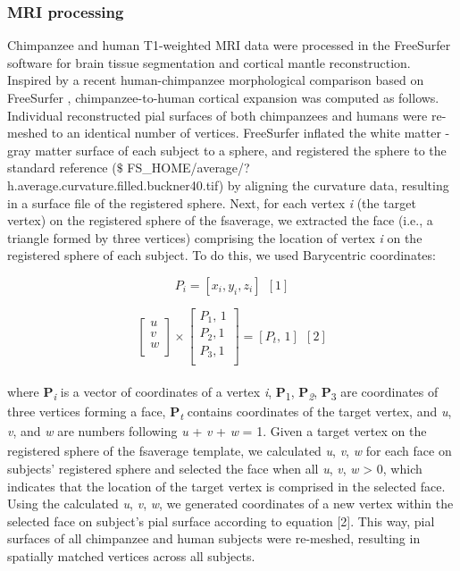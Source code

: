 \begin{refsection}
\subsubsection*{MRI processing}
Chimpanzee and human T1-weighted MRI data were processed in the FreeSurfer software \citep{Fischl2004parcellation,FISCHL2012Freesurfer} for brain tissue segmentation and cortical mantle reconstruction. Inspired by a recent human-chimpanzee morphological comparison based on FreeSurfer \citep{donahue2018quantitative}, chimpanzee-to-human cortical expansion was computed as follows. Individual reconstructed pial surfaces of both chimpanzees and humans were re-meshed to an identical number of vertices. FreeSurfer inflated the white matter - gray matter surface of each subject to a sphere, and registered the sphere to the standard reference ($\$$ FS\_HOME/average/?h.average.curvature.filled.buckner40.tif) by aligning the curvature data, resulting in a surface file of the registered sphere. Next, for each vertex \textit{i} (the target vertex) on the registered sphere of the fsaverage, we extracted the face (i.e., a triangle formed by three vertices) comprising the location of vertex \textit{i} on the registered sphere of each subject. To do this, we used Barycentric coordinates:

\[ P_{i}= [x_{i}, y_{i}, z_{i}] \ \ [1] \]

\[  \left[ \begin{matrix}
u\\
v\\
w\\
\end{matrix}
 \right]  \times  \left[ \begin{matrix}
P_{1}\text{, 1}\\
P_{2},1\\
P_{3},1\\
\end{matrix}
 \right] = \left[ P_{t}\text{, 1} \right] \ \ [2] \] \\

where \textbf{P}\textit{\textsubscript{i}} is a vector of coordinates of a vertex \textit{i}, \textbf{P}\textsubscript{1}, \textbf{P}\textit{\textsubscript{2}}, \textbf{P}\textsubscript{3} are coordinates of three vertices forming a face, \textbf{P}\textit{\textsubscript{t}}\textsubscript{ }contains coordinates of the target vertex, and \textit{u}, \textit{v}, and \textit{w} are numbers following \textit{u} + \textit{v} + \textit{w} = 1. Given a target vertex\textit{\textsubscript{ }}on the registered sphere of the fsaverage template, we calculated \textit{u}, \textit{v}, \textit{w }for each face on subjects’ registered sphere and selected the face when all \textit{u}, \textit{v}, \textit{w} > 0, which indicates that the location of the target vertex is comprised in the selected face. Using the calculated \textit{u}, \textit{v}, \textit{w}, we generated coordinates of a new vertex within the selected face on subject’s pial surface according to equation [2]. This way, pial surfaces of all chimpanzee and human subjects were re-meshed, resulting in spatially matched vertices across all subjects.


\end{refsection}
